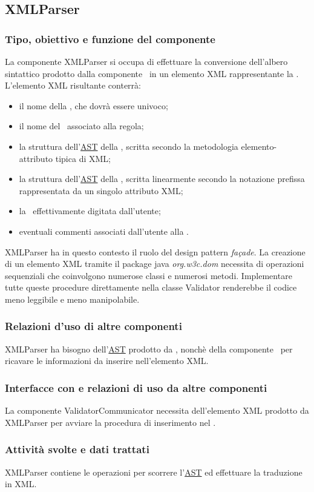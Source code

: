 \subsection{XMLParser}%
\subsubsection{Tipo, obiettivo e funzione del componente}
La componente XMLParser si occupa di effettuare la conversione dell'albero sintattico prodotto dalla componente \brp\ in un elemento XML rappresentante la \br. L'elemento XML risultante conterr\`a:
\begin{itemize}
 \item il nome della \br, che dovr\`a essere univoco;
 \item il nome del \bo\ associato alla regola;
 \item la struttura dell'\underline{AST} della \br, scritta secondo la metodologia elemento-attributo tipica di XML;
 \item la struttura dell'\underline{AST} della \br, scritta linearmente secondo la notazione prefissa rappresentata da un singolo attributo XML;
 \item la \br\ effettivamente digitata dall'utente;
 \item eventuali commenti associati dall'utente alla \br.
\end{itemize}
XMLParser ha in questo contesto il ruolo del design pattern \textit{fa\c{c}ade}. La creazione di un elemento XML tramite il package java \textit{org.w3c.dom} necessita di operazioni sequenziali che coinvolgono numerose classi e numerosi metodi. Implementare tutte queste procedure direttamente nella classe Validator renderebbe il codice meno leggibile e meno manipolabile.
\subsubsection{Relazioni d'uso di altre componenti}
XMLParser ha bisogno dell'\underline{AST} prodotto da \brp, nonch\`e  della componente \br\ per ricavare le informazioni da inserire nell'elemento XML.
\subsubsection{Interfacce con e relazioni di uso da altre componenti}
La componente ValidatorCommunicator necessita dell'elemento XML prodotto da XMLParser per avviare la procedura di inserimento nel \rp.
\subsubsection{Attivit\`a svolte e dati trattati}
XMLParser contiene le operazioni per scorrere l'\underline{AST} ed effettuare la traduzione in XML.

